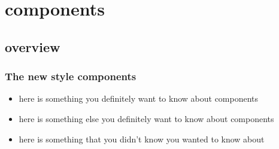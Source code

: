 %
%


\section{components}
\subsection{overview}

\begin{frame}[fragile]
%
  \frametitle{The new style components}
%
  \begin{itemize}
%
    \item here is something you definitely want to know about components
%
    \item here is something else you definitely want to know about components
%
    \item here is something that you didn't know you wanted to know about
%
  \end{itemize}
%
\end{frame}

